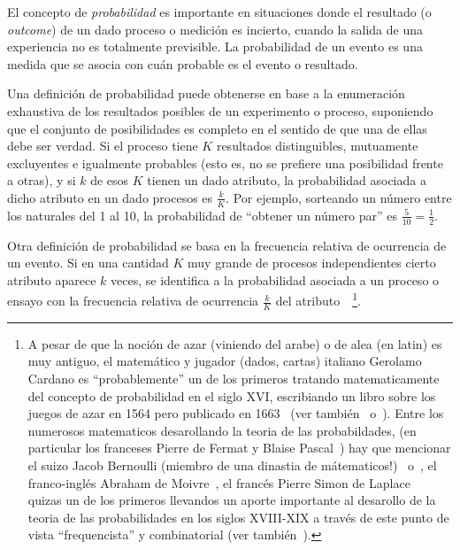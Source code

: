 \label{s:MP:Probabilidad}

El  concepto  de  {\it  probabilidad}  es importante  en  situaciones  donde  el
resultado (o {\it outcome}) de un  dado proceso o medici\'on es incierto, cuando
la salida de una experiencia no  es totalmente previsible. La probabilidad de un
evento es una medida que se asocia con cu\'an probable es el evento o resultado.

Una  definici\'on de  probabilidad puede  obtenerse en  base a  la enumeraci\'on
exhaustiva de los resultados posibles de un experimento o proceso,
suponiendo que el conjunto de posibilidades es completo en el sentido de que una
de  ellas debe ser  verdad. Si  el proceso  tiene $K$  resultados distinguibles,
mutuamente  excluyentes e  igualmente probables  (esto  es, no  se prefiere  una
posibilidad frente a  otras), y si $k$  de esos $K$ tienen un  dado atributo, la
probabilidad asociada a dicho atributo en un dado procesos es $\frac{k}{K}$. Por
ejemplo, sorteando un n\'umero entre los  naturales del 1 al 10, la probabilidad
de ``obtener un n\'umero par'' es $\frac5{10} = \frac12$.

Otra  definici\'on  de  probabilidad  se  basa  en  la  frecuencia  relativa  de
ocurrencia  de  un evento.   Si  en  una cantidad  $K$  muy  grande de  procesos
independientes  cierto   atributo  aparece  $k$   veces,  se  identifica   a  la
probabilidad  asociada a  un  proceso o  ensayo  con la  frecuencia relativa  de
ocurrencia    $\frac{k}{K}$    del    atributo~\cite[\&   Ref.]{Bra76,    Hal90,
  ShaVov06}~\footnote{A pesar de que la  noci\'on de azar (viniendo del arabe) o
  de alea (en  latin) es muy antiguo, el matem\'atico  y jugador (dados, cartas)
  italiano  Gerolamo Cardano es  ``probablemente'' un  de los  primeros tratando
  matematicamente del concepto  de probabilidad en el siglo  XVI, escribiando un
  libro sobre  los juegos  de azar en  1564 pero publicado  en 1663~\cite{Car63}
  (ver  tambi\'en~\cite{Bel05}  o~\cite[Cap.~4]{Hal90}).   Entre  los  numerosos
  matematicos desarollando  la teoria de  las probabildades, (en  particular los
  franceses  Pierre  de Fermat  y  Blaise  Pascal~\cite[Cap.~5]{Hal90}) hay  que
  mencionar   el   suizo  Jacob   Bernoulli   (miembro   de   una  dinastia   de
  m\'atematicos!)~\cite[en      latin]{Ber1713}      o~\cite{Ber1713:2},      el
  franco-ingl\'es Abraham  de Moivre~\cite{Dem56}, el franc\'es  Pierre Simon de
  Laplace~\cite{Lap20} quizas un de  los primeros llevandos un aporte importante
  al desarollo  de la  teoria de  las probabilidades en  los siglos  XVIII-XIX a
  trav\'es  de  este  punto  de  vista  ``frequencista''  y  combinatorial  (ver
  tambi\'en~\cite[Cap.~13, 15 \&~22]{Hal90}).}.

